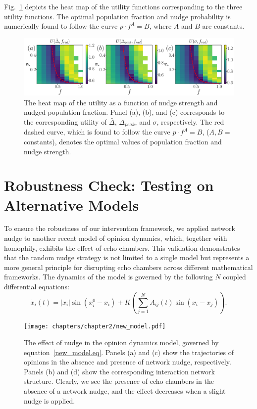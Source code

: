 Fig.~\ref{fig:optimization} depicts the heat map of the utility functions corresponding to the three utility functions. The optimal population fraction and nudge probability is numerically found to follow the curve $p\cdot f^A = B$, where $A$ and $B$ are constants.

\begin{figure}[ht]
    \centering
    \includegraphics[width=\textwidth]{chapters/chapter2/opimization.pdf}
    \caption{The heat map of the utility as a function of nudge strength and nudged population fraction. Panel (a), (b), and (c) corresponds 
    to the corresponding utility of $\bar \Delta$, $\Delta_{peak}$, and $\sigma$, respectively. The red dashed curve, which is found to 
    follow the curve $p\cdot f^A = B$, ($A, B = $ constants), denotes the optimal values of population fraction and nudge strength.}
    \label{fig:optimization}
\end{figure}

\section{Robustness Check: Testing on Alternative Models}

To ensure the robustness of our intervention framework, we applied network nudge to another recent model \cite{modeling-explosive-opinion-depolarization-in-interdependent-topics} of opinion dynamics, which, together with homophily, exhibits the effect of echo chambers. This validation demonstrates that the random nudge strategy is not limited to a single model but represents a more general principle for disrupting echo chambers across different mathematical frameworks. The dynamics of the model is governed by the following $N$ coupled differential equations:
\begin{equation}
    \label{new_model.eq}
    \dot{x}_i(t)= |x_i|\sin{(x_i^0- x_i)} + K \left(\sum^{N}_{j=1} A_{ij} (t)  \sin{(x_i - x_j)}\right).
\end{equation}
\begin{figure}[H]
    \centering
    \texttt{[image: chapters/chapter2/new\_model.pdf]}
    \caption{The effect of nudge in the opinion dynamics model, governed by equation~\eqref{new_model.eq}. Panels (a) and (c) show the trajectories of opinions in the absence and presence of network nudge, respectively. Panels (b) and (d) show the corresponding interaction network structure. Clearly, we see the presence of echo chambers in the absence of a network nudge, and the effect decreases when a slight nudge is applied.}
    \label{fig:new_model}
\end{figure}

